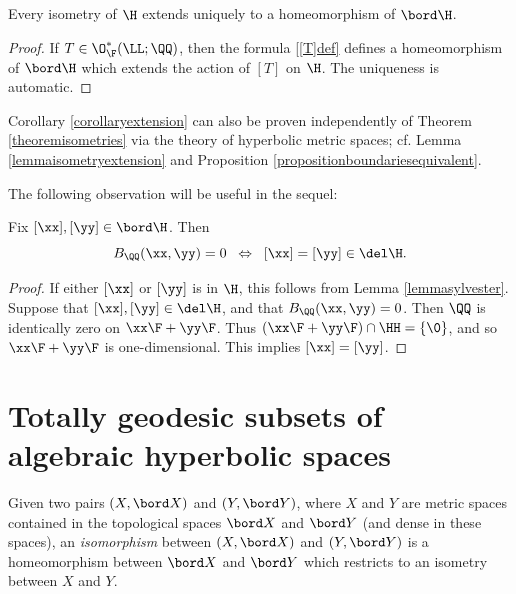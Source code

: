 \begin{corollary}
\label{corollaryextension}
Every isometry of $\H$ extends uniquely to a homeomorphism of $\bord\H$.
\end{corollary}
\begin{proof}
If $T\in\O_\F^*(\LL;\QQ)$, then the formula \eqref{[T]def} defines a homeomorphism of $\bord\H$ which extends the action of $[T]$ on $\H$. The uniqueness is automatic.
\end{proof}
\begin{remark}
Corollary \ref{corollaryextension} can also be proven independently of Theorem \ref{theoremisometries} via the theory of hyperbolic metric spaces; cf. Lemma \ref{lemmaisometryextension} and Proposition \ref{propositionboundariesequivalent}.
\end{remark}

The following observation will be useful in the sequel:
\begin{observation}
\label{observationBQnonzero}
Fix $[\xx],[\yy]\in\bord\H$. Then
\[
B_\QQ(\xx,\yy) = 0 \;\;\Leftrightarrow\;\; [\xx] = [\yy] \in\del\H.
\]
\end{observation}
\begin{proof}
If either $[\xx]$ or $[\yy]$ is in $\H$, this follows from Lemma \ref{lemmasylvester}. Suppose that $[\xx],[\yy]\in\del\H$, and that $B_\QQ(\xx,\yy) = 0$. Then $\QQ$ is identically zero on $\xx\F + \yy\F$. Thus $(\xx\F + \yy\F)\cap\HH = \{\0\}$, and so $\xx\F + \yy\F$ is one-dimensional. This implies $[\xx] = [\yy]$.
\end{proof}

\section{Totally geodesic subsets of algebraic hyperbolic spaces}
\label{subsectiontotallygeodesic}

Given two pairs $(X,\bord X)$ and $(Y,\bord Y)$, where $X$ and $Y$ are metric spaces contained in the topological spaces $\bord X$ and $\bord Y$ (and dense in these spaces), an \emph{isomorphism} between $(X,\bord X)$ and $(Y,\bord Y)$ is a homeomorphism between $\bord X$ and $\bord Y$ which restricts to an isometry between $X$ and $Y$.

